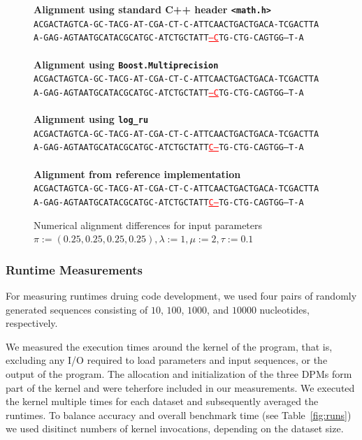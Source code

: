 \documentclass[runningheads,a4paper]{llncs}
\begin{document}
\begin{figure}

\textbf{Alignment using standard C++ header \texttt{<math.h>}}
~
\\
\texttt{ACGACTAGTCA-GC-TACG-AT-CGA-CT-C-ATTCAACTGACTGACA-TCGACTTA} \\
\texttt{A-GAG-AGTAATGCATACGCATGC-ATCTGCTATT\textcolor{red}{\underline{---C}}TG-CTG-CAGTGG--T-A}
\\~\\
\textbf{Alignment using \texttt{Boost.Multiprecision}}
~
\\
\texttt{ACGACTAGTCA-GC-TACG-AT-CGA-CT-C-ATTCAACTGACTGACA-TCGACTTA} \\
\texttt{A-GAG-AGTAATGCATACGCATGC-ATCTGCTATT\textcolor{red}{\underline{---C}}TG-CTG-CAGTGG--T-A}
\\~\\
\textbf{Alignment using \texttt{log\_ru}}
~
\\
\texttt{ACGACTAGTCA-GC-TACG-AT-CGA-CT-C-ATTCAACTGACTGACA-TCGACTTA} \\
\texttt{A-GAG-AGTAATGCATACGCATGC-ATCTGCTATT\textcolor{red}{\underline{C---}}TG-CTG-CAGTGG--T-A}
\\~\\
\textbf{Alignment from reference implementation}
~
\\
\texttt{ACGACTAGTCA-GC-TACG-AT-CGA-CT-C-ATTCAACTGACTGACA-TCGACTTA} \\
\texttt{A-GAG-AGTAATGCATACGCATGC-ATCTGCTATT\textcolor{red}{\underline{C---}}TG-CTG-CAGTGG--T-A}

\caption{Numerical alignment differences for input parameters $\pi:=(0.25,0.25,0.25,0.25), \lambda:=1, \mu:= 2, \tau := 0.1$}
\label{fig:alignments}
\end{figure}

\subsubsection{Runtime Measurements}
\label{team2-runtimes}

For measuring runtimes druing code development, we used four pairs of randomly generated sequences consisting of $10$, $100$, $1000$, and $10000$ nucleotides, respectively.

We measured the execution times around the kernel of the program, that is, excluding any I/O required to load parameters and input sequences, or the output of the program. 
The allocation and initialization of the three DPMs form part of the kernel and were teherfore included in our measurements.
We executed the kernel multiple times for each dataset and subsequently averaged the runtimes.
To balance accuracy and overall benchmark time (see Table~\ref{fig:runs}) we used disitinct numbers of kernel invocations, depending on the dataset size.
\end{document}
